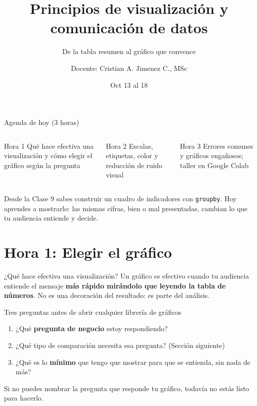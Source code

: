 \documentclass[aspectratio=169,11pt]{beamer}
\title{Principios de visualización y comunicación de datos}
\subtitle{De la tabla resumen al gráfico que convence}
\author{Docente: Cristian A. Jimenez C., MSc}
\date{Oct 13 al 18}
\begin{document}
{
\begin{frame}[plain]
  \titlepage
\end{frame}
}

\begin{frame}{Agenda de hoy (3 horas)}
  \begin{columns}[T,onlytextwidth]
    \begin{block}{Hora 1}
      \small Qué hace efectiva una visualización y cómo elegir el gráfico
      según la pregunta
    \end{block}
    \begin{block}{Hora 2}
      \small Escalas, etiquetas, color y reducción de ruido visual
    \end{block}
    \begin{block}{Hora 3}
      \small Errores comunes y gráficos engañosos; taller en Google Colab
    \end{block}
  \end{columns}
  \vspace{0.4cm}
  \small Desde la Clase 9 sabes construir un cuadro de indicadores con
  \texttt{groupby}. Hoy aprendes a mostrarlo: las mismas cifras, bien o mal
  presentadas, cambian lo que tu audiencia entiende y decide.
\end{frame}

\section{Hora 1: Elegir el gráfico}
\begin{frame}{¿Qué hace efectiva una visualización?}
  \small
  Un gráfico es efectivo cuando tu audiencia entiende el mensaje
  \textbf{más rápido mirándolo que leyendo la tabla de números}. No es una
  decoración del resultado: es parte del análisis.
  \vspace{0.2cm}
  \begin{block}{Tres preguntas antes de abrir cualquier librería de gráficos}
    \small
    \begin{enumerate}
      \item ¿Qué \textbf{pregunta de negocio} estoy respondiendo?
      \item ¿Qué tipo de comparación necesita esa pregunta? (Sección
        siguiente)
      \item ¿Qué es lo \textbf{mínimo} que tengo que mostrar para que se
        entienda, sin nada de más?
    \end{enumerate}
  \end{block}
  \small Si no puedes nombrar la pregunta que responde tu gráfico, todavía
  no estás listo para hacerlo.
\end{frame}
\end{document}
